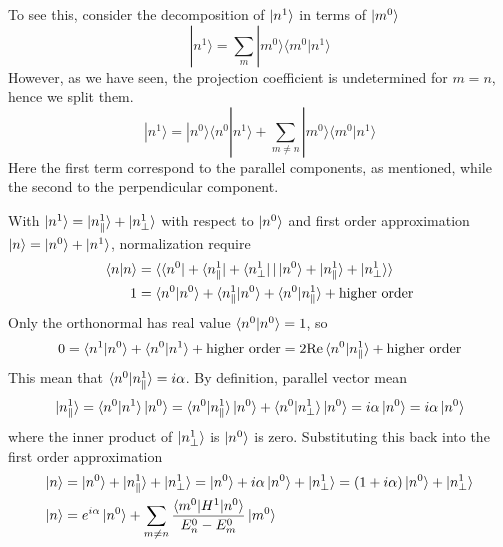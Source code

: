 \documentclass[../../../main.tex]{subfiles}
\begin{document}
To see this, consider the decomposition of $\ket{n ^{1 }}$ in terms of $\ket{m ^{0}}$
\begin{equation*}
    |n^{1}\rangle = \sum_{m} |m^{0}\rangle \langle m^{0}|n^{1}\rangle
\end{equation*}
However, as we have seen, the projection coefficient is undetermined for $m=n$, hence we split them.
\begin{equation*}
    |n^{1}\rangle = |n^{0}\rangle \langle n^{0}|n^{1}\rangle+\sum_{m \neq n} |m^{0}\rangle \langle m^{0}|n^{1}\rangle
\end{equation*}
Here the first term correspond to the parallel components, as mentioned, while the second to the perpendicular component.

With $\ket{n^1}=\ket{n_\parallel^1}+\ket{n_\perp^1}$ with respect to $\ket{n^0}$ and first order approximation $\ket{n}=\ket{n^0}+\ket{n ^{1}}$, normalization require
\begin{align*}
    \braket{n  | n } & =  \braket{\bra{n^0}+\bra{n_\parallel^1}+\bra{n_\perp^1} | \ket{n^0}+\ket{n_\parallel^1}+\ket{n_\perp^1}}                          \\
    1                & =  \langle n^0 | n^0 \rangle + \langle n^1_{\parallel} | n^0 \rangle + \langle n^0 | n^1_{\parallel} \rangle + \text{higher order}
\end{align*}
Only the orthonormal has real value $\braket{n^0 | n^0 }=1$, so
\begin{equation*}
    0 = \langle n^1 | n^0 \rangle + \langle n^0 | n^1 \rangle + \text{higher order} = 2 \mathrm{Re }\braket{n ^{0 } | n ^{1 }_{\parallel}}+ \text{higher order}
\end{equation*}
This mean  that $\braket{n ^{0 } | n ^{1 }_{\parallel}}= i\alpha$.
By definition, parallel vector mean
\begin{equation*}
    \ket{n_{\parallel} ^{1}} = \braket{n ^{0 } | n ^{1 }} \ket{n ^{0}}
    =\braket{n ^{0 } | n ^{1 }_\parallel} \ket{n ^{0}} + \braket{n ^{0 } | n ^{1 }_\perp} \ket{n ^{0}}
    = i \alpha \ket{n ^{0 }} = i\alpha  \ket{n ^{0 }}
\end{equation*}
where the inner product of $\ket{n ^{1}_\perp}$ is $\ket{n ^{0}}$ is zero.
Substituting this back into the first order approximation
\begin{align*}
    \ket{n}
     & = \ket{n^0}+\ket{n_\parallel^1}+\ket{n_\perp^1}
    =\ket{n^0}+i\alpha\ket{n^0}+\ket{n_\perp^1}
    =(1+i\alpha)\ket{n^0}+\ket{n_\perp^1}                                                                           \\
    \ket{n}
     & =  e ^{i\alpha}\ket{n^0}+\sum_{m \neq n} \frac{ \braket{m^{0} | H^{1} | n^{0} }}{E^{0}_n - E^{0}_m}\ket{m^0}
\end{align*}
\end{document}
